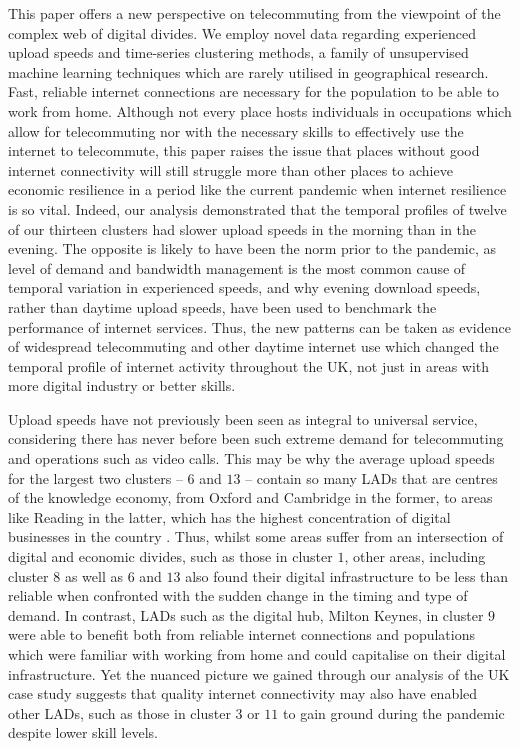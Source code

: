 \documentclass[Royal,times,sageh]{sagej}
\begin{document}
This paper offers a new perspective on telecommuting from the viewpoint
of the complex web of digital divides. We employ novel data regarding
experienced upload speeds and time-series clustering methods, a family
of unsupervised machine learning techniques which are rarely utilised in
geographical research. Fast, reliable internet connections are necessary
for the population to be able to work from home. Although not every
place hosts individuals in occupations which allow for telecommuting nor
with the necessary skills to effectively use the internet to
telecommute, this paper raises the issue that places without good
internet connectivity will still struggle more than other places to
achieve economic resilience in a period like the current pandemic when
internet resilience is so vital. Indeed, our analysis demonstrated that
the temporal profiles of twelve of our thirteen clusters had slower
upload speeds in the morning than in the evening. The opposite is likely
to have been the norm prior to the pandemic, as level of demand and
bandwidth management is the most common cause of temporal variation in
experienced speeds, and why evening download speeds, rather than daytime
upload speeds, have been used to benchmark the performance of internet
services. Thus, the new patterns can be taken as evidence of widespread
telecommuting and other daytime internet use which changed the temporal
profile of internet activity throughout the UK, not just in areas with
more digital industry or better skills.

Upload speeds have not previously been seen as integral to universal
service, considering there has never before been such extreme demand for
telecommuting and operations such as video calls. This may be why the
average upload speeds for the largest two clusters -- \(6\) and \(13\)
-- contain so many LADs that are centres of the knowledge economy, from
Oxford and Cambridge in the former, to areas like Reading in the latter,
which has the highest concentration of digital businesses in the country
\citep{technation2017}. Thus, whilst some areas suffer from an
intersection of digital and economic divides, such as those in cluster
\(1\), other areas, including cluster \(8\) as well as \(6\) and \(13\)
also found their digital infrastructure to be less than reliable when
confronted with the sudden change in the timing and type of demand. In
contrast, LADs such as the digital hub, Milton Keynes, in cluster \(9\)
were able to benefit both from reliable internet connections and
populations which were familiar with working from home and could
capitalise on their digital infrastructure. Yet the nuanced picture we
gained through our analysis of the UK case study suggests that quality
internet connectivity may also have enabled other LADs, such as those in
cluster \(3\) or \(11\) to gain ground during the pandemic despite lower
skill levels.
\end{document}
